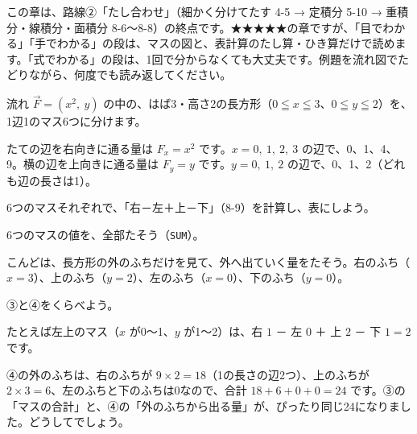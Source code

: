 この章は、路線②「たし合わせ」（細かく分けてたす 4-5 → 定積分 5-10 → 重積分・線積分・面積分 8-6〜8-8）の終点です。★★★★★の章ですが、「目でわかる」「手でわかる」の段は、マスの図と、表計算のたし算・ひき算だけで読めます。「式でわかる」の段は、1回で分からなくても大丈夫です。例題を流れ図でたどりながら、何度でも読み返してください。

\begin{yattemiyou}
流れ $\vec F=(x^2,\ y)$ の中の、はば3・高さ2の長方形（$0\leqq x\leqq3$、$0\leqq y\leqq2$）を、1辺1のマス6つに分けます。
\begin{enumerate}[label={\bkcircled[bkGreen]{\arabic*}}, leftmargin=2.4\zw, itemsep=1pt, topsep=3pt]
\item たての辺を右向きに通る量は $F_x=x^2$ です。$x=0,\ 1,\ 2,\ 3$ の辺で、0、1、4、9。横の辺を上向きに通る量は $F_y=y$ です。$y=0,\ 1,\ 2$ の辺で、0、1、2（どれも辺の長さは1）。
\item 6つのマスそれぞれで、「右－左＋上－下」（8-9）を計算し、表にしよう。
\item 6つのマスの値を、全部たそう（\texttt{SUM}）。
\item こんどは、長方形の外のふちだけを見て、外へ出ていく量をたそう。右のふち（$x=3$）、上のふち（$y=2$）、左のふち（$x=0$）、下のふち（$y=0$）。
\item ③と④をくらべよう。
\end{enumerate}
たとえば左上のマス（$x$ が0〜1、$y$ が1〜2）は、右 $1$ － 左 $0$ ＋ 上 $2$ － 下 $1=2$ です。
\begin{bkcenter}
\end{bkcenter}
\end{yattemiyou}

\noindent ④の外のふちは、右のふちが $9\times2=18$（1の長さの辺2つ）、上のふちが $2\times3=6$、左のふちと下のふちは0なので、合計 $18+6+0+0=24$ です。③の「マスの合計」と、④の「外のふちから出る量」が、ぴったり同じ24になりました。どうしてでしょう。

